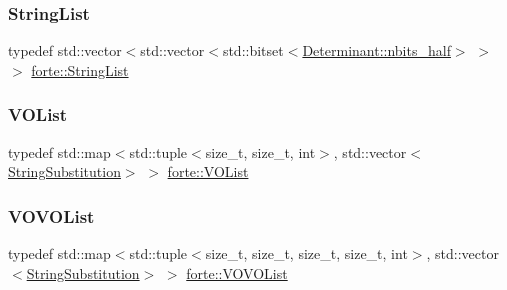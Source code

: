 \mbox{\label{namespaceforte_aca998efba411157767fc84335aaa3abc}} 
\subsubsection{\texorpdfstring{String\+List}{StringList}}
{\footnotesize\ttfamily typedef std\+::vector$<$std\+::vector$<$std\+::bitset$<$\mbox{\hyperlink{classforte_1_1_determinant_impl_ac8d2a64c2fb785ccb79b1cecc553d63d}{Determinant\+::nbits\+\_\+half}}$>$ $>$ $>$ \mbox{\hyperlink{namespaceforte_aca998efba411157767fc84335aaa3abc}{forte\+::\+String\+List}}}

\mbox{\label{namespaceforte_a06d02b08c65b4a59d056aa83839110d3}} 
\subsubsection{\texorpdfstring{V\+O\+List}{VOList}}
{\footnotesize\ttfamily typedef std\+::map$<$std\+::tuple$<$size\+\_\+t, size\+\_\+t, int$>$, std\+::vector$<$\mbox{\hyperlink{structforte_1_1_string_substitution}{String\+Substitution}}$>$ $>$ \mbox{\hyperlink{namespaceforte_a06d02b08c65b4a59d056aa83839110d3}{forte\+::\+V\+O\+List}}}

\mbox{\label{namespaceforte_a1d7711c26aa3c0c41f36ca87c42aad43}} 
\subsubsection{\texorpdfstring{V\+O\+V\+O\+List}{VOVOList}}
{\footnotesize\ttfamily typedef std\+::map$<$std\+::tuple$<$size\+\_\+t, size\+\_\+t, size\+\_\+t, size\+\_\+t, int$>$, std\+::vector$<$\mbox{\hyperlink{structforte_1_1_string_substitution}{String\+Substitution}}$>$ $>$ \mbox{\hyperlink{namespaceforte_a1d7711c26aa3c0c41f36ca87c42aad43}{forte\+::\+V\+O\+V\+O\+List}}}

\mbox{\label{namespaceforte_a2554bbadd74253084e41d64216f6da95}} 
